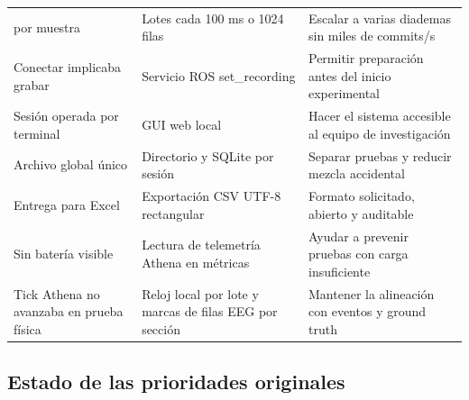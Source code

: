 \documentclass[11pt,a4paper]{article}
\begin{document}
\begin{longtable}{@{}>{\raggedright\arraybackslash}p{}>{\raggedright\arraybackslash}p{}>{\raggedright\arraybackslash}p{}@{}}
{\ttfamily\small commit} por muestra & Lotes cada 100 ms o 1024 filas & Escalar a varias diademas sin miles de commits/s \\
Conectar implicaba grabar & Servicio ROS {\ttfamily\small set\_recording} & Permitir preparación antes del inicio experimental \\
Sesión operada por terminal & GUI web local & Hacer el sistema accesible al equipo de investigación \\
Archivo global único & Directorio y SQLite por sesión & Separar pruebas y reducir mezcla accidental \\
Entrega para Excel & Exportación CSV UTF-8 rectangular & Formato solicitado, abierto y auditable \\
Sin batería visible & Lectura de telemetría Athena en métricas & Ayudar a prevenir pruebas con carga insuficiente \\
Tick Athena no avanzaba en prueba física & Reloj local por lote y marcas de filas EEG por sección & Mantener la alineación con eventos y ground truth \\
\bottomrule
\end{longtable}

\subsection{Estado de las prioridades originales}
\end{document}
